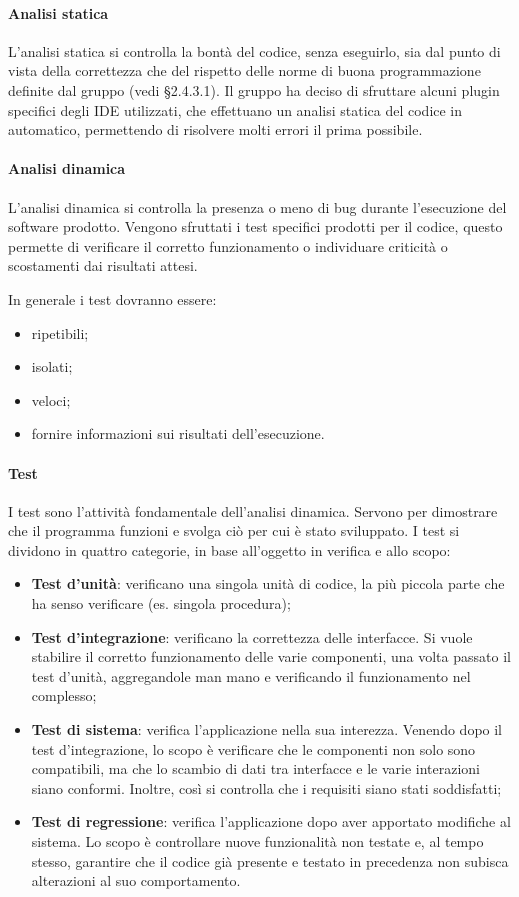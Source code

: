 \paragraph{Analisi statica}
L'analisi statica si controlla la bontà del codice, senza eseguirlo, sia dal punto di vista della correttezza che del rispetto delle norme di buona programmazione definite dal gruppo (vedi §2.4.3.1). Il gruppo ha deciso di sfruttare alcuni plugin specifici degli IDE utilizzati, che effettuano un analisi statica del codice in automatico, permettendo di risolvere molti errori il prima possibile.

\paragraph{Analisi dinamica}
L'analisi dinamica si controlla la presenza o meno di bug durante l'esecuzione del software prodotto. Vengono sfruttati i test specifici prodotti per il codice, questo permette di verificare il corretto funzionamento o individuare criticità o scostamenti dai risultati attesi.

In generale i test dovranno essere:
\begin{itemize}
	\item ripetibili;
	\item isolati;
	\item veloci;
	\item fornire informazioni sui risultati dell’esecuzione.
\end{itemize}

\paragraph{Test}
I test sono l'attività fondamentale dell'analisi dinamica. Servono per dimostrare che il programma funzioni e svolga ciò per cui è stato sviluppato. I test si dividono in quattro categorie, in base all'oggetto in verifica e allo scopo: 
\begin{itemize}
\item \textbf{Test d'unità}: verificano una singola unità di codice, la più piccola parte che ha senso verificare (es. singola procedura);
\item \textbf{Test d'integrazione}: verificano la correttezza delle interfacce. Si vuole stabilire il corretto funzionamento delle varie componenti, una volta passato il test d'unità, aggregandole man mano e verificando il funzionamento nel complesso;
\item \textbf{Test di sistema}: verifica l'applicazione nella sua interezza. Venendo dopo il test d'integrazione, lo scopo è verificare che le componenti non solo sono compatibili, ma che lo scambio di dati tra interfacce e le varie interazioni siano conformi. Inoltre, così si controlla che i requisiti siano stati soddisfatti;
\item \textbf{Test di regressione}: verifica l'applicazione dopo aver apportato modifiche al sistema. Lo scopo è controllare nuove funzionalità non testate e, al tempo stesso, garantire che il codice già presente e testato in precedenza non subisca alterazioni al suo comportamento.
\end{itemize}

